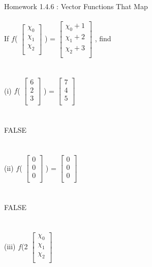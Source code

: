 \documentclass[11pt]{article}
\begin{document}
Homework 1.4.6 : Vector Functions That Map
\\
\\
If $f$(
$
\begin{bmatrix}
{\chi_{0}}\\
{\chi_{1}}\\
{\chi_{2}}\\
\end{bmatrix}$
)
=
$
\begin{bmatrix}
{\chi_{0} + 1}\\
{\chi_{1} + 2}\\
{\chi_{2} + 3}\\
\end{bmatrix}$
, find
\\
\\
\\
(i)
$f$(
$
\begin{bmatrix}
{6}\\
{2}\\
{3}\\
\end{bmatrix}$
)
=
$
\begin{bmatrix}
{7}\\
{4}\\
{5}\\
\end{bmatrix}$
\\
\\
\\
FALSE
\\
\\
\\
(ii)
$f$(
$
\begin{bmatrix}
{0}\\
{0}\\
{0}\\
\end{bmatrix}$
)
=
$
\begin{bmatrix}
{0}\\
{0}\\
{0}\\
\end{bmatrix}$
\\
\\
\\
FALSE
\\
\\
\\
(iii)
$f$(2
$
\begin{bmatrix}
{\chi_{0}}\\
{\chi_{1}}\\
{\chi_{2}}\\
\end{bmatrix}$
\end{document}
